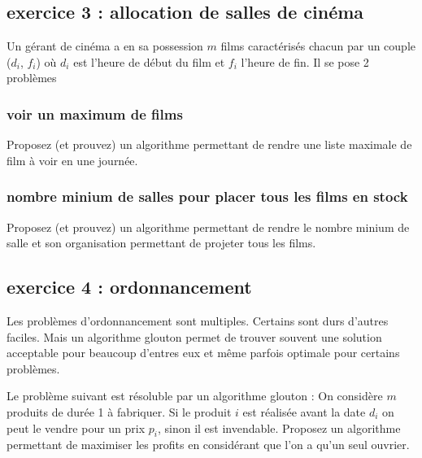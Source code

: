 \documentclass[
]{article}
\begin{document}
\hypertarget{exercice-3-allocation-de-salles-de-cinuxe9ma}{%
\subsection{exercice 3 : allocation de salles de
cinéma}\label{exercice-3-allocation-de-salles-de-cinuxe9ma}}

Un gérant de cinéma a en sa possession \(m\) films caractérisés chacun
par un couple (\(d_i\), \(f_i\)) où \(d_i\) est l'heure de début du film
et \(f_i\) l'heure de fin. Il se pose 2 problèmes

\hypertarget{voir-un-maximum-de-films}{%
\subsubsection{voir un maximum de
films}\label{voir-un-maximum-de-films}}

Proposez (et prouvez) un algorithme permettant de rendre une liste
maximale de film à voir en une journée.

\hypertarget{nombre-minium-de-salles-pour-placer-tous-les-films-en-stock}{%
\subsubsection{nombre minium de salles pour placer tous les films en
stock}\label{nombre-minium-de-salles-pour-placer-tous-les-films-en-stock}}

Proposez (et prouvez) un algorithme permettant de rendre le nombre
minium de salle et son organisation permettant de projeter tous les
films.

\hypertarget{exercice-4-ordonnancement}{%
\subsection{exercice 4 :
ordonnancement}\label{exercice-4-ordonnancement}}

Les problèmes d'ordonnancement sont multiples. Certains sont durs
d'autres faciles. Mais un algorithme glouton permet de trouver souvent
une solution acceptable pour beaucoup d'entres eux et même parfois
optimale pour certains problèmes.

Le problème suivant est résoluble par un algorithme glouton : On
considère \(m\) produits de durée 1 à fabriquer. Si le produit \(i\) est
réalisée avant la date \(d_i\) on peut le vendre pour un prix \(p_i\),
sinon il est invendable. Proposez un algorithme permettant de maximiser
les profits en considérant que l'on a qu'un seul ouvrier.
\end{document}
